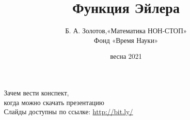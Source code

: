 \documentclass[aspectratio=1610,12pt,notheorems]{beamer}
\title[Euler Function]
    {\bfseries Функция Эйлера}
\author[\ ]
	{Б. А. Золотов,\quad «Математика НОН-СТОП»\\ \vspace{0.3cm}
		{\small Фонд «Время Науки»}}
\institute[\ ]{\ }
\date{весна 2021}
\begin{document}
\frame{\titlepage}

\begin{frame} \begin{center}
	{\Large Зачем вести конспект,\smallskip\\
		когда можно скачать презентацию} \\ [0.9cm]
	{\small Слайды доступны по ссылке: \url{http://bit.ly/}}
\end{center} \end{frame}
\end{document}
